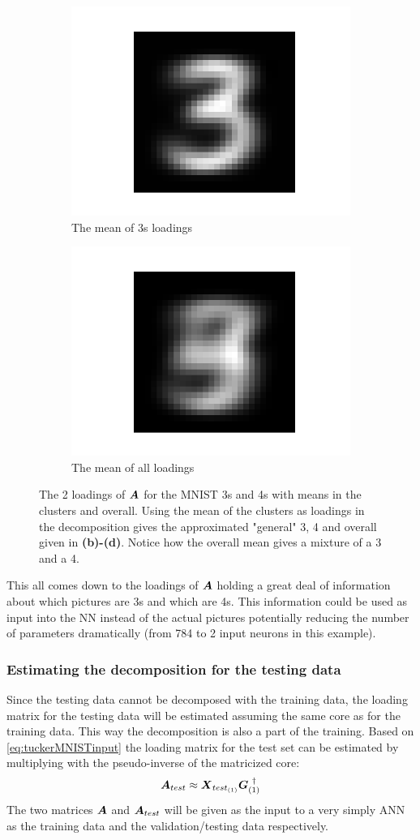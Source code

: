 \begin{figure}
    \begin{subfigure}{0.3\linewidth}
    \centering
        \includegraphics[width=.5\linewidth]{Pics/05_methodology/general3.png}
        \caption{The mean of 3s loadings}
    \end{subfigure}
    \begin{subfigure}{0.3\linewidth}
    \centering
        \includegraphics[width=.5\linewidth]{Pics/05_methodology/general.png}
        \caption{The mean of all loadings}
        \label{Hej}
    \end{subfigure}
    \caption{The 2 loadings of $\boldsymbol{A}$ for the MNIST 3s and 4s with means in the clusters and overall. Using the mean of the clusters as loadings in the decomposition gives the approximated "general" 3, 4 and overall given in \textbf{(b)-(d)}. Notice how the overall mean gives a mixture of a 3 and a 4. }
    \label{fig:loadingsOfA}
\end{figure}

This all comes down to the loadings of $\boldsymbol{A}$ holding a great deal of information about which pictures are 3s and which are 4s. This information could be used as input into the NN instead of the actual pictures potentially reducing the number of parameters dramatically (from 784 to 2 input neurons in this example). 

\subsubsection{Estimating the decomposition for the testing data}
Since the testing data cannot be decomposed with the training data, the loading matrix for the testing data will be estimated assuming the same core as for the training data. This way the decomposition is also a part of the training. Based on \eqref{eq:tuckerMNISTinput} the loading matrix for the test set can be estimated by multiplying with the pseudo-inverse of the matricized core:
\begin{equation}
    \boldsymbol{A}_{test} \approx \boldsymbol{X}_{test_{(1)}} \boldsymbol{G}_{(1)}^{\ \dagger}
\end{equation}
The two matrices $\boldsymbol{A}$ and $\boldsymbol{A}_{test}$ will be given as the input to a very simply ANN as the training data and the validation/testing data respectively.


